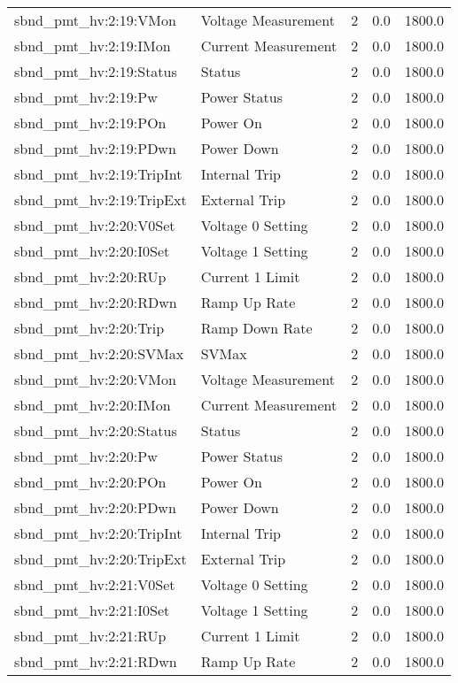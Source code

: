 \begin{center}
\begin{longtable}{l | l l l l }
sbnd\_pmt\_hv:2:19:VMon & Voltage Measurement & 2 & 0.0 & 1800.0\\ 
sbnd\_pmt\_hv:2:19:IMon & Current Measurement & 2 & 0.0 & 1800.0\\ 
sbnd\_pmt\_hv:2:19:Status & Status & 2 & 0.0 & 1800.0\\ 
sbnd\_pmt\_hv:2:19:Pw & Power Status & 2 & 0.0 & 1800.0\\ 
sbnd\_pmt\_hv:2:19:POn & Power On & 2 & 0.0 & 1800.0\\ 
sbnd\_pmt\_hv:2:19:PDwn & Power Down & 2 & 0.0 & 1800.0\\ 
sbnd\_pmt\_hv:2:19:TripInt & Internal Trip & 2 & 0.0 & 1800.0\\ 
sbnd\_pmt\_hv:2:19:TripExt & External Trip & 2 & 0.0 & 1800.0\\ 
sbnd\_pmt\_hv:2:20:V0Set & Voltage 0 Setting & 2 & 0.0 & 1800.0\\ 
sbnd\_pmt\_hv:2:20:I0Set & Voltage 1 Setting & 2 & 0.0 & 1800.0\\ 
sbnd\_pmt\_hv:2:20:RUp & Current 1 Limit & 2 & 0.0 & 1800.0\\ 
sbnd\_pmt\_hv:2:20:RDwn & Ramp Up Rate & 2 & 0.0 & 1800.0\\ 
sbnd\_pmt\_hv:2:20:Trip & Ramp Down Rate & 2 & 0.0 & 1800.0\\ 
sbnd\_pmt\_hv:2:20:SVMax & SVMax & 2 & 0.0 & 1800.0\\ 
sbnd\_pmt\_hv:2:20:VMon & Voltage Measurement & 2 & 0.0 & 1800.0\\ 
sbnd\_pmt\_hv:2:20:IMon & Current Measurement & 2 & 0.0 & 1800.0\\ 
sbnd\_pmt\_hv:2:20:Status & Status & 2 & 0.0 & 1800.0\\ 
sbnd\_pmt\_hv:2:20:Pw & Power Status & 2 & 0.0 & 1800.0\\ 
sbnd\_pmt\_hv:2:20:POn & Power On & 2 & 0.0 & 1800.0\\ 
sbnd\_pmt\_hv:2:20:PDwn & Power Down & 2 & 0.0 & 1800.0\\ 
sbnd\_pmt\_hv:2:20:TripInt & Internal Trip & 2 & 0.0 & 1800.0\\ 
sbnd\_pmt\_hv:2:20:TripExt & External Trip & 2 & 0.0 & 1800.0\\ 
sbnd\_pmt\_hv:2:21:V0Set & Voltage 0 Setting & 2 & 0.0 & 1800.0\\ 
sbnd\_pmt\_hv:2:21:I0Set & Voltage 1 Setting & 2 & 0.0 & 1800.0\\ 
sbnd\_pmt\_hv:2:21:RUp & Current 1 Limit & 2 & 0.0 & 1800.0\\ 
sbnd\_pmt\_hv:2:21:RDwn & Ramp Up Rate & 2 & 0.0 & 1800.0\\ 

\end{longtable}
\end{center}
